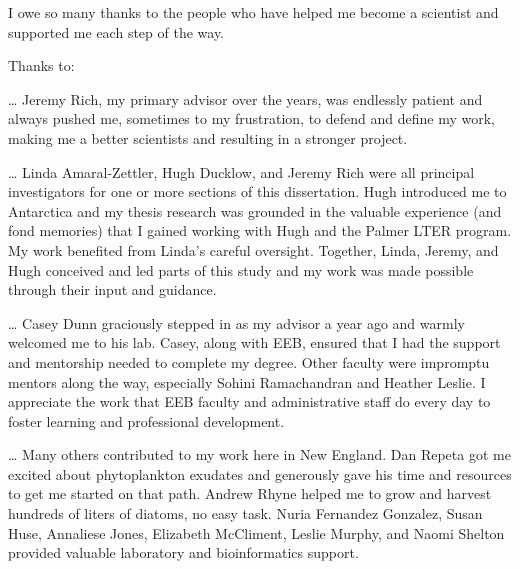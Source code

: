 \documentclass[final,letter,oneside,
12pt, %
doublespacing, %
]{brownthesis} %
\begin{document}
\singlespacing




\doublespacing
{}

I owe so many thanks to the people who have helped me become a scientist and supported me each step of the way.
 
Thanks to:
 
… Jeremy Rich, my primary advisor over the years, was endlessly patient and always pushed me, sometimes to my frustration, to defend and define my work, making me a better scientists and resulting in a stronger project.
 
… Linda Amaral-Zettler, Hugh Ducklow, and Jeremy Rich were all principal investigators for one or more sections of this dissertation. Hugh introduced me to Antarctica and my thesis research was grounded in the valuable experience (and fond memories) that I gained working with Hugh and the Palmer LTER program. My work benefited from Linda’s careful oversight. Together, Linda, Jeremy, and Hugh conceived and led parts of this study and my work was made possible through their input and guidance.
 
… Casey Dunn graciously stepped in as my advisor a year ago and warmly welcomed me to his lab. Casey, along with EEB, ensured that I had the support and mentorship needed to complete my degree. Other faculty were impromptu mentors along the way, especially Sohini Ramachandran and Heather Leslie. I appreciate the work that EEB faculty and administrative staff do every day to foster learning and professional development. 
 
… Many others contributed to my work here in New England. Dan Repeta got me excited about phytoplankton exudates and generously gave his time and resources to get me started on that path. Andrew Rhyne helped me to grow and harvest hundreds of liters of diatoms, no easy task. Nuria Fernandez Gonzalez, Susan Huse, Annaliese Jones, Elizabeth McCliment, Leslie Murphy, and Naomi Shelton provided valuable laboratory and bioinformatics support.
 
\end{document}
